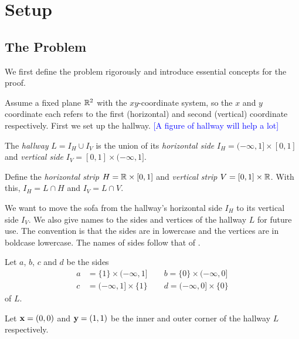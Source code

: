 \section{Setup}


\subsection{The Problem}
We first define the problem rigorously and introduce essential concepts for the proof.

Assume a fixed plane $\mathbb{R}^2$ with the $xy$-coordinate system, so the $x$ and $y$ coordinate each refers to the first (horizontal) and second (vertical) coordinate respectively.
First we set up the hallway.
\textcolor{blue}{[A figure of hallway will help a lot]}
\begin{definition}
The \emph{hallway} $L = I_H \cup I_V$ is the union of its \emph{horizontal side} $I_H = (-\infty, 1] \times [0, 1]$ and \emph{vertical side} $I_V = [0, 1] \times (-\infty, 1]$. 

Define the \emph{horizontal strip} $H = \mathbb{R} \times [0, 1]$ and \emph{vertical strip} $V = [0, 1] \times \mathbb{R}$. 
With this, $I_H = L \cap H$ and $I_V = L \cap V$.
\end{definition}
We want to move the sofa from the hallway's horizontal side $I_H$ to its vertical side $I_V$.
We also give names to the sides and vertices of the hallway $L$ for future use. The convention is that the sides are in lowercase and the vertices are in boldcase lowercase. The names of sides follow that of \cite{romik2018differential}.
\begin{definition}
Let $a$, $b$, $c$ and $d$ be the sides 
\begin{align*}
a & = \{1\} \times (-\infty, 1] \qquad b = \{0\} \times (-\infty, 0] \\
c & = (-\infty, 1] \times \{1\} \qquad d = (-\infty, 0] \times \{0\}
\end{align*}
of $L$. 
\end{definition}
\begin{definition}
Let $\mathbf{x} = (0, 0)$ and $\mathbf{y} = (1, 1)$ be the inner and outer corner of the hallway $L$ respectively.
\end{definition}

